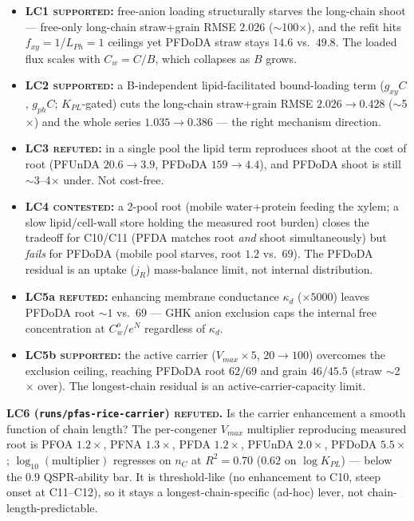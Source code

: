 \documentclass[11pt]{article}
\begin{document}
\begin{itemize}
  \item \textbf{LC1 \textsc{supported}:} free-anion loading
        structurally starves the long-chain shoot --- free-only
        long-chain straw+grain RMSE $2.026$ ($\sim$100$\times$), and
        the refit hits $f_{xy}{=}1$/$L_{Ph}{=}1$ ceilings yet PFDoDA
        straw stays $14.6$ vs.\ $49.8$. The loaded flux scales with
        $C_w=C/B$, which collapses as $B$ grows.
  \item \textbf{LC2 \textsc{supported}:} a B-independent
        lipid-facilitated bound-loading term ($g_{xy}C$, $g_{ph}C$;
        $K_{PL}$-gated) cuts the long-chain straw+grain RMSE
        $2.026\!\to\!0.428$ ($\sim$5$\times$) and the whole series
        $1.035\!\to\!0.386$ --- the right mechanism direction.
  \item \textbf{LC3 \textsc{refuted}:} in a single pool the lipid term
        reproduces shoot at the cost of root (PFUnDA $20.6\!\to\!3.9$,
        PFDoDA $159\!\to\!4.4$), and PFDoDA shoot is still
        $\sim$3--4$\times$ under. Not cost-free.
  \item \textbf{LC4 \textsc{contested}:} a 2-pool root (mobile
        water$+$protein feeding the xylem; a slow lipid/cell-wall
        store holding the measured root burden) closes the tradeoff
        for C10/C11 (PFDA matches root \emph{and} shoot
        simultaneously) but \emph{fails} for PFDoDA (mobile pool
        starves, root $1.2$ vs.\ $69$). The PFDoDA residual is an
        uptake ($j_R$) mass-balance limit, not internal distribution.
  \item \textbf{LC5a \textsc{refuted}:} enhancing membrane conductance
        $\kappa_d$ ($\times 5000$) leaves PFDoDA root $\sim 1$ vs.\
        $69$ --- GHK anion exclusion caps the internal free
        concentration at $C_w^o/e^{N}$ regardless of $\kappa_d$.
  \item \textbf{LC5b \textsc{supported}:} the active carrier
        ($V_{max}\times 5$, $20\!\to\!100$) overcomes the exclusion
        ceiling, reaching PFDoDA root $62/69$ and grain $46/45.5$
        (straw $\sim$2$\times$ over). The longest-chain residual is an
        active-carrier-capacity limit.
\end{itemize}

\textbf{LC6 (\texttt{runs/pfas-rice-carrier}) \textsc{refuted}.} Is the
carrier enhancement a smooth function of chain length? The
per-congener $V_{max}$ multiplier reproducing measured root is PFOA
$1.2\times$, PFNA $1.3\times$, PFDA $1.2\times$, PFUnDA $2.0\times$,
PFDoDA $5.5\times$; $\log_{10}(\text{multiplier})$ regresses on $n_C$
at $R^2=0.70$ ($0.62$ on $\log K_{PL}$) --- below the $0.9$
QSPR-ability bar. It is threshold-like (no enhancement to C10, steep
onset at C11--C12), so it stays a longest-chain-specific (ad-hoc)
lever, not chain-length-predictable.
\end{document}
